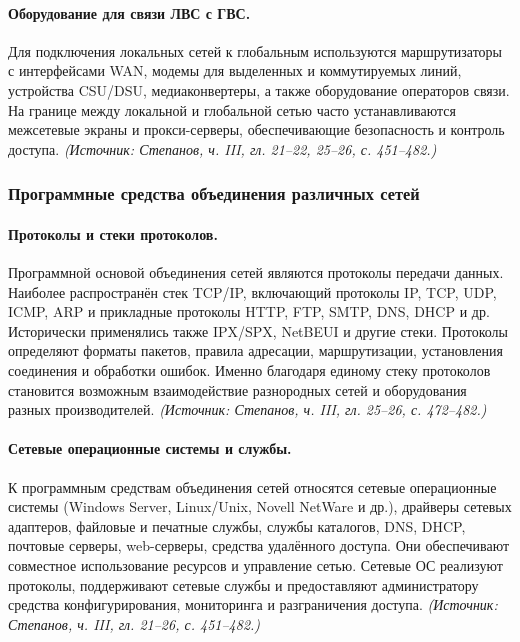 \documentclass[a4paper,12pt]{article}
\begin{document}
\paragraph{Оборудование для связи ЛВС с ГВС.}
Для подключения локальных сетей к глобальным используются маршрутизаторы с интерфейсами WAN, модемы для выделенных и коммутируемых линий, устройства CSU/DSU, медиаконвертеры, а также оборудование операторов связи. На границе между локальной и глобальной сетью часто устанавливаются межсетевые экраны и прокси-серверы, обеспечивающие безопасность и контроль доступа.
\textit{(Источник: Степанов, ч. III, гл. 21–22, 25–26, с. 451–482.)}

\subsubsection{Программные средства объединения различных сетей}

\paragraph{Протоколы и стеки протоколов.}
Программной основой объединения сетей являются протоколы передачи данных. Наиболее распространён стек TCP/IP, включающий протоколы IP, TCP, UDP, ICMP, ARP и прикладные протоколы HTTP, FTP, SMTP, DNS, DHCP и др. Исторически применялись также IPX/SPX, NetBEUI и другие стеки. Протоколы определяют форматы пакетов, правила адресации, маршрутизации, установления соединения и обработки ошибок. Именно благодаря единому стеку протоколов становится возможным взаимодействие разнородных сетей и оборудования разных производителей.
\textit{(Источник: Степанов, ч. III, гл. 25–26, с. 472–482.)}

\paragraph{Сетевые операционные системы и службы.}
К программным средствам объединения сетей относятся сетевые операционные системы (Windows Server, Linux/Unix, Novell NetWare и др.), драйверы сетевых адаптеров, файловые и печатные службы, службы каталогов, DNS, DHCP, почтовые серверы, web-серверы, средства удалённого доступа. Они обеспечивают совместное использование ресурсов и управление сетью. Сетевые ОС реализуют протоколы, поддерживают сетевые службы и предоставляют администратору средства конфигурирования, мониторинга и разграничения доступа.
\textit{(Источник: Степанов, ч. III, гл. 21–26, с. 451–482.)}
\end{document}
